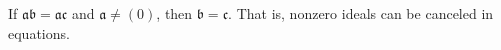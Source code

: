 If $\mathfrak{a}\mathfrak{b} = \mathfrak{a}\mathfrak{c}$ and $\mathfrak{a} \neq (0)$, then $\mathfrak{b} = \mathfrak{c}$. That is, nonzero ideals can be canceled in equations.
